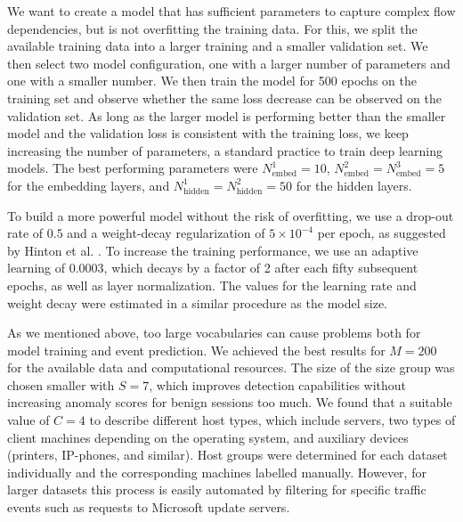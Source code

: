 We want to create a model that has sufficient parameters to capture complex flow dependencies, but is not overfitting the training data. For this, we split the available training data into a larger training and a smaller validation set. We then select two model configuration, one with a larger number of parameters and one with a smaller number. We then train the model for 500 epochs on the training set and observe whether the same loss decrease can be observed on the validation set. As long as the larger model is performing better than the smaller model and the validation loss is consistent with the training loss, we keep increasing the number of parameters, a standard practice to train deep learning models. The best performing parameters were $N^1_{\text{embed}}=10$, $N^2_{\text{embed}}=N^3_{\text{embed}}=5$ for the embedding layers, and $N^1_{\text{hidden}}=N^2_{\text{hidden}}=50$ for the hidden layers.

To build a more powerful model without the risk of overfitting, we use a drop-out rate of $0.5$ and a weight-decay regularization of $5\times 10^{-4}$ per epoch, as suggested by Hinton et al. \cite{srivastava2014dropout}. To increase the training performance, we use an adaptive learning of $0.0003$, which decays by a factor of 2 after each fifty subsequent epochs, as well as layer normalization. The values for the learning rate and weight decay were estimated in a similar procedure as the model size. 

As we mentioned above, too large vocabularies can cause problems both for model training and event prediction. We achieved the best results for $M=200$ for the available data and computational resources. The size of the size group was chosen smaller with $S=7$, which improves detection capabilities without increasing anomaly scores for benign sessions too much. 
We found that a suitable value of $C=4$ to describe different host types, which include servers, two types of client machines depending on the operating system, and auxiliary devices (printers, IP-phones, and similar). Host groups were determined for each dataset individually and the corresponding machines labelled manually. However, for larger datasets this process is easily automated by filtering for specific traffic events such as requests to Microsoft update servers.


